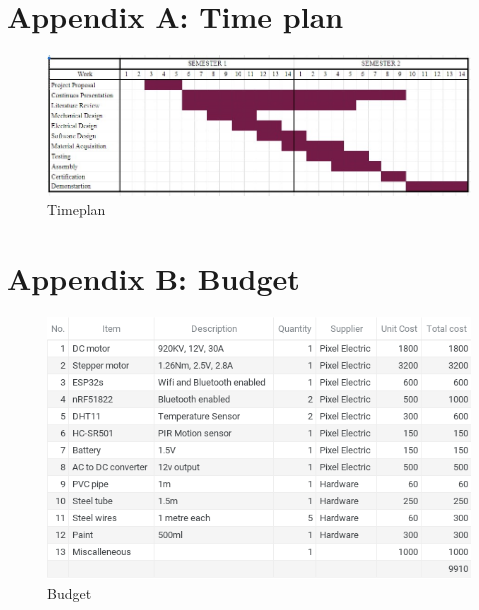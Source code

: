 

\section*{Appendix A: Time plan}
\begin{figure}[hb]
\includegraphics[scale=0.6]{Figures/timeplane.jpg}
\centering
\caption{Timeplan}
\label{fig:timeplan}
\end{figure}

\section*{Appendix B: Budget}

\begin{figure}[hb]
\includegraphics[scale=0.5]{Figures/budget.png}
\centering
\caption{Budget}
\label{fig:budget}
\end{figure}

